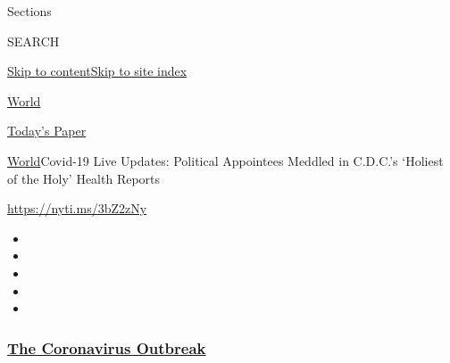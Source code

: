 Sections

SEARCH

\protect\hyperlink{site-content}{Skip to
content}\protect\hyperlink{site-index}{Skip to site index}

\href{https://www.nytimes3xbfgragh.onion/section/world}{World}

\href{https://myaccount.nytimes3xbfgragh.onion/auth/login?response_type=cookie\&client_id=vi}{}

\href{https://www.nytimes3xbfgragh.onion/section/todayspaper}{Today's
Paper}

\href{/section/world}{World}\textbar{}Covid-19 Live Updates: Political
Appointees Meddled in C.D.C.'s `Holiest of the Holy' Health Reports

\url{https://nyti.ms/3bZ2zNy}

\begin{itemize}
\item
\item
\item
\item
\item
\end{itemize}

\hypertarget{the-coronavirus-outbreak}{%
\subsubsection{\texorpdfstring{\href{https://www.nytimes3xbfgragh.onion/news-event/coronavirus?name=styln-coronavirus\&region=TOP_BANNER\&block=storyline_menu_recirc\&action=click\&pgtype=Article\&impression_id=22545620-f52c-11ea-a21f-29f6111ec990\&variant=undefined}{The
Coronavirus
Outbreak}}{The Coronavirus Outbreak}}\label{the-coronavirus-outbreak}}

